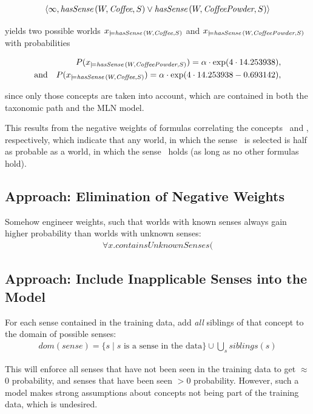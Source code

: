\documentclass[12pt,a4paper]{article}
\begin{document}
\begin{eqnarray}
	\left<\infty, \textit{hasSense\,}(W, \textit{Coffee}, S)\vee \textit{hasSense\,}(W, \textit{CoffeePowder}, S)\right>\nonumber	
\end{eqnarray}

yields two possible worlds $x_{\models\textit{hasSense\,}(W,\textit{Coffee},S)}$ and
$x_{\models\textit{hasSense\,}(W,\textit{CoffeePowder},S)}$ with probabilities

\begin{eqnarray}
	&& 	P(x_{\models\textit{hasSense\,}(W,\textit{CoffeePowder},S)})=\alpha\cdot\exp (4\cdot 14.253938), \nonumber\\
	\text{and}&& P(x_{\models\textit{hasSense\,}(W,\textit{Coffee},S)})=\alpha\cdot\exp (4\cdot 14.253938 - 0.693142),\nonumber
\end{eqnarray}

since only those concepts are taken into account, which are contained in
both the taxonomic path and the MLN model. 

This results from the negative weights of formulas correlating the 
concepts \FruitJuice\ and \Beverage, respectively, which indicate 
that any world, in which the sense \Beverage\ is selected is half as 
probable as a world, in which the sense \Liquid\ holds (as long as 
no other formulas hold). 

\subsection{Approach: Elimination of Negative Weights}

Somehow engineer weights, such that worlds with known senses always gain 
higher probability than worlds with unknown senses:
\begin{eqnarray}
	\forall x. \textit{containsUnknownSenses(}
\end{eqnarray} 

\subsection{Approach: Include Inapplicable Senses into the Model}

For each sense contained in the training data, add \emph{all} siblings
of that concept to the domain of possible senses:
\begin{eqnarray}
	\textit{dom}(\textit{sense})=\{s\mid s \text{ is a sense in the data}\}\cup\bigcup_{s}\textit{siblings}(s)\nonumber
\end{eqnarray}

This will enforce all senses that have not been seen in the training 
data to get $\approx$0 probability, and senses that have been seen 
$>$0 probability. However, such a model makes strong assumptions 
about concepts not being part of the training data, which is 
undesired.
\end{document}
